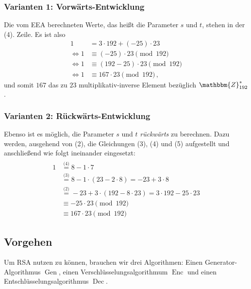 \begin{beispiel}[EEA]
  \subsubsection*{Varianten 1: Vorwärts-Entwicklung} Die vom EEA
  berechneten Werte, das heißt die Parameter $s$ und $t$, stehen in der
  (4). Zeile. Es ist also
  \begin{align*} 1 &= 3 \cdot 192 + (-25) \cdot 23\\ \Leftrightarrow 1
                   &\equiv (-25) \cdot 23 \pmod{192}\\ \Leftrightarrow 1 &\equiv (192 - 25)
                                                                           \cdot 23 \pmod{192}\\ \Leftrightarrow 1 &\equiv 167 \cdot 23
                                                                                                                     \pmod{192}\, \text{,}
  \end{align*} und somit $167$ das zu $23$ multiplikativ-inverse
  Element bezüglich $\mathbbm{Z}^{\ast}_{192}$.
  \subsubsection*{Varianten 2: Rückwärts-Entwicklung} Ebenso ist es
  möglich, die Parameter $s$ und $t$ \emph{rückwärts} zu berechnen. Dazu
  werden, ausgehend von (2), die Gleichungen (3), (4) und (5) aufgestellt
  und anschließend wie folgt ineinander eingesetzt:
  \begin{align*}
    \begin{split} 1 &\stackrel{\textit{(4)}}{=} 8 - 1 \cdot 7\\
      &\stackrel{\textit{(3)}}{=} 8 - 1 \cdot (23 - 2 \cdot 8) = -23 + 3 \cdot
      8\\ &\stackrel{\textit{(2)}}{=} -23 + 3 \cdot (192 - 8 \cdot 23) = 3
      \cdot 192 - 25 \cdot 23\\[.5cm] &\equiv -25 \cdot 23 \pmod{192}\\
      &\equiv 167 \cdot 23 \pmod{192}
    \end{split}
  \end{align*}
\end{beispiel}

\subsection{Vorgehen}
\label{ch:asymmenc:rsa:vorgehen} Um RSA \indexRSATextBook nutzen zu
können, brauchen wir drei Algorithmen: Einen Generator-Algorithmus
$\operatorname{Gen}$, einen Verschlüsselungsalgorithmum
$\operatorname{Enc}$ und einen Entschlüsselungsalgorithmus
$\operatorname{Dec}$.
